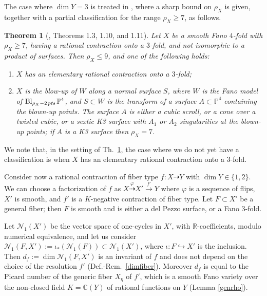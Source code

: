 \documentclass[a4paper,12pt]{amsart}
\newtheorem{thm}{Theorem}[section]
\theoremstyle{definition}
\numberwithin{figure}{section}
\numberwithin{table}{section}
\newcommand{\ph}{\varphi}
\newcommand{\pr}{\mathbb{P}}
\newcommand{\C}{\mathbb{C}}
\newcommand{\R}{\mathbb{R}}
\newcommand{\N}{\mathcal{N}_1}
\newcommand{\Bl}{\operatorname{Bl}}
\newcommand{\pts}{\text{\it pts}}
\newcommand{\s}{\scriptscriptstyle}
\begin{document}
The case where $\dim Y=3$ is treated in \cite{3folds}, where a sharp bound on $\rho_X$ is given, together with a partial classification for the range $\rho_X\geq 7$, as follows.
\begin{thm}[\cite{3folds}, Theorems 1.3, 1.10, and 1.11]\label{CS}
    Let $X$ be a smooth Fano $4$-fold with $\rho_X\geq 7$, having a rational contraction onto a $3$-fold,
and    not isomorphic to a product of surfaces.
    Then $\rho_X\leq 9$, and one of the following holds:
    \begin{enumerate}[$(i)$]
\item $X$ has an elementary rational contraction onto a $3$-fold;
\item  $X$ is the blow-up of $W$ along a normal surface $S$,
where $W$ is the Fano model of $\Bl_{\rho_{\s X}-2\mskip2mu\pts}\pr^4$, and $S\subset W$ is the transform of a surface $A\subset\pr^4$ containing the blown-up points. The surface $A$ is either
 a cubic scroll, or
  a cone over a twisted cubic, or a sextic K3 surface with $A_1$ or $A_2$ singularities at the blown-up points; if $A$ is a K3 surface then $\rho_X=7$.
\end{enumerate}
 \end{thm}   
 We note that, in the setting of Th.~\ref{CS}, the case where we do not yet have a classification is when $X$ has an elementary rational contraction onto a $3$-fold.

 \medskip

 Consider now a rational contraction of fiber type $f\colon X\dasharrow Y$   with $\dim Y\in\{1,2\}$. We can choose a factorization of $f$ as $X\stackrel{\ph}{\dasharrow} X'\stackrel{f'}{\to} Y$ where $\ph$ is a sequence of flips, $X'$ is smooth,  and $f'$ is a $K$-negative contraction of fiber type. Let $F\subset X'$ be a general fiber; then $F$ is smooth and is either a del Pezzo surface, or a Fano $3$-fold.

Let $\N(X')$ be the vector space of one-cycles in $X'$, with $\R$-coefficients, modulo numerical equivalence, and
 let us consider $\N(F,X'):=\iota_*(\N(F))\subset\N(X')$, where $\iota\colon F\hookrightarrow X'$ is the inclusion. Then $d_f:= \dim\N(F,X')$ is an invariant of $f$ and does not depend on the choice of the resolution $f'$ (Def.-Rem.~\ref{dimfiber}).
 Moreover $d_f$ is equal to the Picard number of the generic fiber $X_\eta$ of $f'$, which is a smooth Fano variety over the non-closed field $K=\C(Y)$ of rational functions on $Y$ (Lemma \ref{genrho}).
\end{document}

